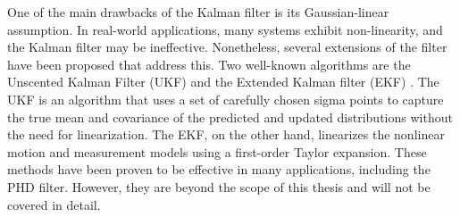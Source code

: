 One of the main drawbacks of the Kalman filter is its Gaussian-linear 
assumption. In real-world applications, many systems exhibit non-linearity, and 
the Kalman filter may be ineffective. Nonetheless, several extensions of the 
filter have been proposed that address this. Two well-known algorithms are the 
Unscented Kalman Filter (UKF) \cite{wanUnscentedKalmanFilter2000a} and the 
Extended Kalman filter (EKF) \cite{smithApplicationStatisticalFilter1962}. The 
UKF is an algorithm that uses a set of carefully chosen sigma points to capture 
the true mean and covariance of the predicted and updated distributions without 
the need for linearization. The EKF, on the other hand, linearizes the 
nonlinear motion and measurement models using a first-order Taylor expansion. 
These methods have been proven to be effective in many applications, including 
the PHD filter. However, they are beyond the scope of this thesis and will not 
be covered in detail.

